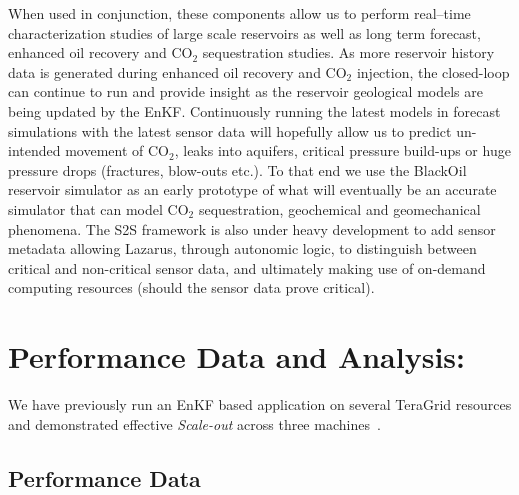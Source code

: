 \documentclass{acm_proc_article-sp}
\newcommand{\jhanote}[1]{ {\textcolor{red} { ***Jha: #1 }}}
\newcommand{\jhanote}[1]{}
\begin{document}
When used in conjunction, these components allow us to perform
real--time characterization studies of large scale reservoirs as well
as long term forecast, enhanced oil recovery and CO$_2$ sequestration
studies. As more reservoir history data is generated during enhanced
oil recovery and CO$_2$ injection, the closed-loop can continue to run
and provide insight as the reservoir geological models are being
updated by the EnKF.  Continuously running the latest models in
forecast simulations with the latest sensor data will hopefully allow
us to predict un-intended movement of CO$_2$, leaks into aquifers,
critical pressure build-ups or huge pressure drops (fractures,
blow-outs etc.). To that end we use the BlackOil reservoir simulator
as an early prototype of what will eventually be an accurate simulator
that can model CO$_2$ sequestration, geochemical and geomechanical
phenomena. The S2S framework is also under heavy development to add
sensor metadata allowing Lazarus, through autonomic logic, to
distinguish between critical and non-critical sensor data, and
ultimately making use of on-demand computing resources (should the
sensor data prove critical).


\section{Performance Data and Analysis:} 

We have previously run an EnKF based application on several TeraGrid
resources and demonstrated effective {\it Scale-out} across three
machines~\cite{gmac}.  %

\subsection{Performance Data} 
\end{document}
